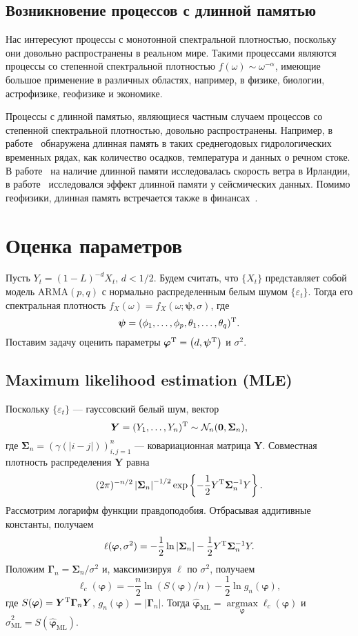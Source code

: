 \documentclass[specialist,
substylefile = spbu_report.rtx,
subf,href,colorlinks=true, 12pt]{disser}
\theoremstyle{definition}
\begin{document}
\subsection{Возникновение процессов с длинной памятью}
Нас интересуют процессы с монотонной спектральной плотностью, поскольку они довольно распространены в реальном мире. Такими процессами являются процессы со степенной спектральной плотностью $f(\omega)\sim \omega^{-\alpha}$, имеющие большое применение в различных областях, например, в физике, биологии, астрофизике, геофизике и экономике.

Процессы с длинной памятью, являющиеся частным случаем процессов со степенной спектральной плотностью, довольно распространены. Например, в работе~\cite{Hipel1994} обнаружена длинная память в таких среднегодовых гидрологических временных рядах, как количество осадков, температура и данных о речном стоке. В работе~\cite{Haslett1989} на наличие длинной памяти исследовалась скорость ветра в Ирландии, в работе~\cite{Mariani2020} исследовался эффект длинной памяти у сейсмических данных. Помимо геофизики, длинная память встречается также в финансах~\cite{Barkoulas1997,Guglielmo2019}.

\section{Оценка параметров}
Пусть $Y_t=(1-L)^{-d}X_t$, $d<1/2$. Будем считать, что $\{X_t\}$ представляет собой модель $\mathrm{ARMA}(p, q)$ с нормально распределенным белым шумом $\{\varepsilon_t\}$. Тогда его спектральная плотность $f_X(\omega)=f_X(\omega; \bm\psi, \sigma)$, где
\[
\bm\psi=(\phi_1,\ldots,\phi_p,\theta_1,\ldots,\theta_q)^{\mathrm{T}}.
\]
Поставим задачу оценить параметры $\bm\varphi^{\mathrm{T}}=\left(d, \bm\psi^{\mathrm{T}}\right)$ и $\sigma^2$.

\subsection{Maximum likelihood estimation (MLE)}
Поскольку $\{\varepsilon_t\}$ --- гауссовский белый шум, вектор
\[
	\bm Y=(Y_1,\ldots,Y_n)^{\mathrm{T}}\sim \mathcal{N}_n(\bm0, \bm\Sigma_n),
\]
где $\bm\Sigma_n=(\gamma(|i-j|))_{i,j=1}^n$ --- ковариационная матрица $\bm Y$. Совместная плотность распределения $\bm Y$ равна
\[
	(2\pi)^{-n/2}\left|\bm\Sigma_n\right|^{-1/2}\exp\left\{-\frac12Y^{\mathrm{T}}\bm\Sigma_n^{-1}Y\right\}.
\]
Рассмотрим логарифм функции правдоподобия. Отбрасывая аддитивные константы, получаем
\[
	\ell(\bm\varphi, \sigma^2)=-\frac12\ln\left|\bm\Sigma_n\right|-\frac12 Y^{\mathrm{T}} \bm\Sigma_n^{-1} Y.
\]
Положим $\bm\Gamma_n=\bm\Sigma_n / \sigma^2$ и, максимизируя $\ell$ по $\sigma^2$, получаем
\[
\ell_c(\bm\varphi)=-\frac{n}{2}\ln\left(S(\bm\varphi) / n\right) - \frac{1}{2}\ln g_n(\bm\varphi),
\] 
где $S(\bm\varphi)=\bm Y^{\mathrm{T}} \bm\Gamma_n\bm Y$, $g_n(\bm\varphi)=\left|\bm\Gamma_n\right|$.
Тогда $\widehat{\bm\varphi}_\mathrm{ML}=\operatorname*{argmax}\limits_{\bm\varphi}\ell_c(\bm\varphi)$ и $\widehat\sigma^2_\mathrm{ML} = S(\widehat{\bm\varphi}_\mathrm{ML})$.
\end{document}
